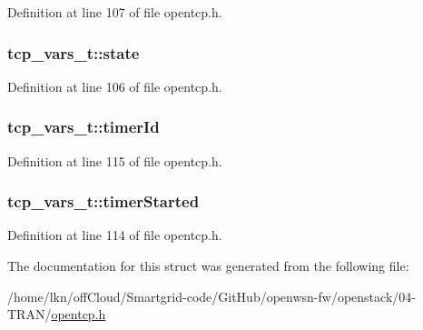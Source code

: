 Definition at line 107 of file opentcp.\+h.

\subsubsection[{\texorpdfstring{state}{state}}]{ tcp\+\_\+vars\+\_\+t\+::state}\hypertarget{structtcp__vars__t_afd22d93533fe0d6c76a578697cc1dea3}{}\label{structtcp__vars__t_afd22d93533fe0d6c76a578697cc1dea3}


Definition at line 106 of file opentcp.\+h.

\subsubsection[{\texorpdfstring{timer\+Id}{timerId}}]{ tcp\+\_\+vars\+\_\+t\+::timer\+Id}\hypertarget{structtcp__vars__t_a0902d2e84e93de3d1e81cd119feb6b8f}{}\label{structtcp__vars__t_a0902d2e84e93de3d1e81cd119feb6b8f}


Definition at line 115 of file opentcp.\+h.

\subsubsection[{\texorpdfstring{timer\+Started}{timerStarted}}]{ tcp\+\_\+vars\+\_\+t\+::timer\+Started}\hypertarget{structtcp__vars__t_a375b45dfa99594ab77a4cef064cca624}{}\label{structtcp__vars__t_a375b45dfa99594ab77a4cef064cca624}


Definition at line 114 of file opentcp.\+h.



The documentation for this struct was generated from the following file\+:\begin{DoxyCompactItemize}
\item 
/home/lkn/off\+Cloud/\+Smartgrid-\/code/\+Git\+Hub/openwsn-\/fw/openstack/04-\/\+T\+R\+A\+N/\hyperlink{opentcp_8h}{opentcp.\+h}\end{DoxyCompactItemize}
